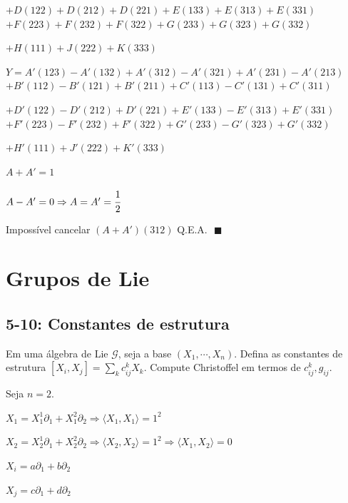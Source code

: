 \documentclass[10pt,a4paper]{article}
\begin{document}
		$ + D(122) + D(212) + D(221) + E(133) + E(313) + E(331)$
		$ + F(223) + F(232) + F(322) + G(233) + G(323) + G(332)$

		$ + H(111) + J(222) + K(333)$

		\vspace{3mm}

		$Y = A'(123) - A'(132) + A'(312) - A'(321) + A'(231) - A'(213)$
		$ + B'(112) - B'(121) + B'(211) + C'(113) - C'(131) + C'(311)$

		$ + D'(122) - D'(212) + D'(221) + E'(133) - E'(313) + E'(331)$
		$ + F'(223) - F'(232) + F'(322) + G'(233) - G'(323) + G'(332)$

		$ + H'(111) + J'(222) + K'(333)$

		\vspace{3mm}

		$A + A' = 1$

		$A - A' = 0 \Rightarrow A = A' = \cfrac{1}{2}$

		Imposs\'ivel cancelar $(A + A')(312)$ Q.E.A. $\,\,\blacksquare$

		\section{Grupos de Lie}
		\begin{flushright}
		\end{flushright}

		\subsection{5-10: Constantes de estrutura}
		\begin{flushright}
		\end{flushright}

		Em uma \'algebra de Lie $\mathcal{G}$, seja a base $(X_1, \cdots, X_n)$. Defina as constantes de estrutura $[X_i, X_j] = \sum_k c_{ij}^k X_k$. Compute Christoffel em termos de $c_{ij}^k, g_{ij}$.

		\vspace{3mm}

		Seja $n = 2$.

		$X_1 = X_1^1 \partial_1 + X_1^2 \partial_2 \Rightarrow \langle X_1, X_1 \rangle = 1^2$

		$X_2 = X_2^1 \partial_1 + X_2^2 \partial_2 \Rightarrow \langle X_2, X_2 \rangle = 1^2 \Rightarrow \langle X_1, X_2 \rangle = 0$

		$X_i = a \partial_1 + b \partial_2$

		$X_j = c \partial_1 + d \partial_2$
\end{document}
